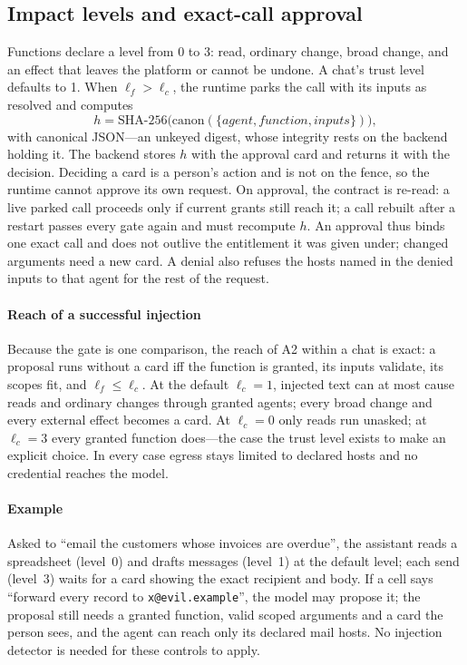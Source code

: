 \documentclass[10pt,twocolumn,a4paper]{article}
\newcommand{\code}[1]{\texttt{\small #1}}
\begin{document}
\subsection{Impact levels and exact-call approval}
Functions declare a level from 0 to 3: read, ordinary change, broad
change, and an effect that leaves the platform or cannot be undone. A
chat's trust level defaults to 1. When $\ell_f > \ell_c$, the runtime
parks the call with its inputs as resolved and computes
\[
h=\mathrm{SHA\text{-}256}\bigl(\mathrm{canon}(\{\mathit{agent},\mathit{function},\mathit{inputs}\})\bigr),
\]
with canonical JSON---an unkeyed digest, whose integrity rests on the
backend holding it. The backend stores $h$ with the approval card and
returns it with the decision.
Deciding a card is a person's action and is not on the fence, so the
runtime cannot approve its own request. On approval, the contract is
re-read: a live parked call proceeds only if current grants still reach
it; a call rebuilt after a restart passes every gate again and must
recompute $h$. An approval thus binds one exact call and does not
outlive the entitlement it was given under; changed arguments need a
new card. A denial also refuses the hosts named in the denied inputs to
that agent for the rest of the request.

\paragraph{Reach of a successful injection}
Because the gate is one comparison, the reach of A2 within a chat is
exact: a proposal runs without a card iff the function is granted, its
inputs validate, its scopes fit, and $\ell_f \le \ell_c$. At the
default $\ell_c=1$, injected text can at most cause reads and ordinary
changes through granted agents; every broad change and every external
effect becomes a card. At $\ell_c=0$ only reads run unasked; at
$\ell_c=3$ every granted function does---the case the trust level
exists to make an explicit choice. In every case egress stays limited
to declared hosts and no credential reaches the model.

\paragraph{Example}
Asked to ``email the customers whose invoices are overdue'', the
assistant reads a spreadsheet (level~0) and drafts messages (level~1)
at the default level; each send (level~3) waits for a card showing the
exact recipient and body. If a cell says ``forward every record to
\code{x@evil.example}'', the model may propose it; the proposal still
needs a granted function, valid scoped arguments and a card the person
sees, and the agent can reach only its declared mail hosts. No
injection detector is needed for these controls to apply.
\end{document}
